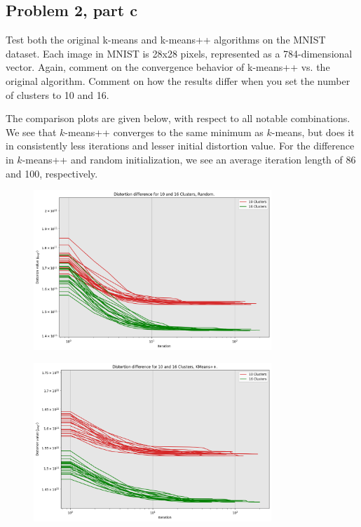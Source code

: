 \clearpage
\newpage
\subsection{Problem 2, part c}
Test both the original k-means and k-means++ algorithms on the MNIST dataset. Each image in MNIST is 28x28 pixels, represented as a 784-dimensional vector. Again, comment on the convergence behavior of k-means++ vs. the original algorithm. Comment on how the results differ when you set the number of clusters to 10 and 16.
\partbreak
\begin{solution}

    The comparison plots are given below, with respect to all notable combinations. We see that $k$-means++ converges to the same minimum as $k$-means, but does it in consistently less iterations and lesser initial distortion value. For the difference in $k$-means++ and random initialization, we see an average iteration length of 86 and 100, respectively.  
\end{solution}

\newpage
\begin{figure}
    \centering
    \includegraphics[width = 0.8\textwidth]{Figure/clusterdifferencerandom.png}
\end{figure}

\begin{figure}
    \centering
    \includegraphics[width = 0.8\textwidth]{Figure/clusterdifferencekmeans.png}
\end{figure}


